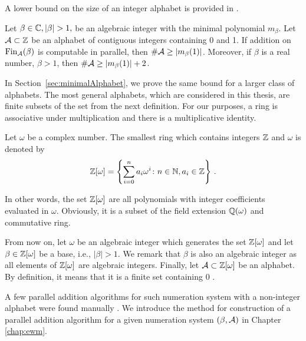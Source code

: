 A lower bound on the size of an integer alphabet is provided in \cite{minAlph}. 
  \begin{thm}
  \label{thm:lowerBoundAlphabet}
Let $\beta\in\CC, |\beta|>1,$  be an algebraic integer with the minimal polynomial $m_\beta$. Let $\mathcal{A}\subset\mathbb{Z}$ be an alphabet of contiguous integers containing 0 and 1. If addition on $\text{Fin}_{\mathcal{A}}(\beta)$ is computable in parallel, then $\#\mathcal{A} \geq |m_\beta(1)|$. Moreover, if $\beta$ is a real number, $\beta>1$, then $\#\mathcal{A} \geq  |m_\beta(1)|+2$.
  \end{thm}
  
In Section~\ref{sec:minimalAlphabet}, we prove the same bound for a larger class of alphabets. The most general alphabets, which are considered in this thesis, are finite subsets of the set from the next definition. For our purposes, a ring is associative under multiplication and there is a multiplicative identity.
\begin{defn}
Let $\omega$ be a complex number. The smallest ring which contains integers $\mathbb{Z}$ and $\omega$ is denoted by
$$
    \mathbb{Z}[\omega] =\left\{\sum_{i=0}^n a_i \omega^i\colon n\in\mathbb{N}, a_i\in\mathbb{Z} \right\} \,.
$$
\end{defn}
In other words, the set $\mathbb{Z}[\omega]$ are all polynomials with integer coefficients evaluated in $\omega$. Obviously, it is a subset of the field extension $\mathbb{Q}(\omega)$ and commutative ring.
    
From now on, let $\omega$ be an algebraic integer  which generates the set $\mathbb{Z}[\omega]$ and let $\beta\in\mathbb{Z}[\omega]$ be a base, i.e., $|\beta|>1$. We remark that $\beta$ is also an algebraic integer as all elements of $\mathbb{Z}[\omega]$ are algebraic integers. Finally, let $\mathcal{A}\subset\mathbb{Z}[\omega]$ be an alphabet. By definition, it means that it is a finite set containing 0 .

A few parallel addition algorithms for such numeration system with a non-integer alphabet were found manually \cite{milena}. We introduce the method for construction of a parallel addition algorithm for a given numeration system $(\beta,\mathcal{A})$ in Chapter \ref{chap:ewm}. 
